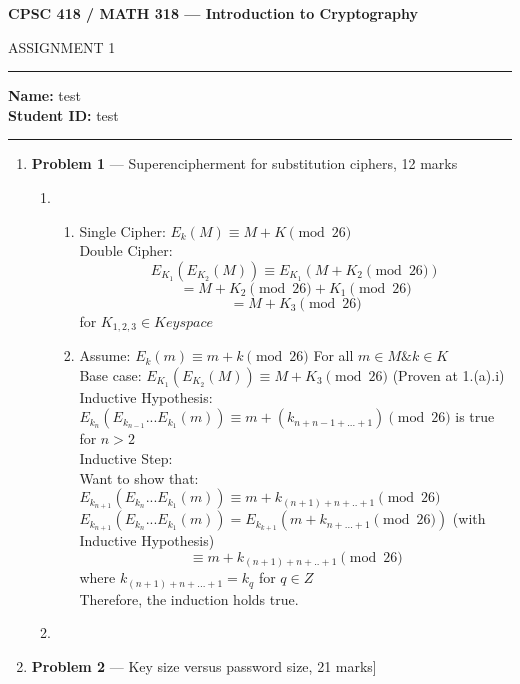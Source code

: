\documentclass[11pt]{article}
\theoremstyle{definition}
\begin{document}
	\begin{center}
		{\bf \Large CPSC 418 / MATH 318 --- Introduction to Cryptography
		
		ASSIGNMENT 1 %
		}
	\end{center}
	
	\hrule 	
	
	\textbf{Name:} test  \\
	\textbf{Student ID:} test 
	
	\medskip \hrule
	
	\begin{enumerate}
	
		\item[] \textbf{Problem 1} --- Superencipherment for substitution ciphers, 12 marks
	
	\begin{enumerate}
		\item
		\begin{enumerate}
			\item Single Cipher: $E_{k}(M) \equiv M + K \pmod{26}$\\
				Double Cipher:\\
				\[E_{K_{1}}(E_{K_{2}}(M)) \equiv E_{K_{1}}(M+K_{2}\pmod{26})\]
				\[= M + K_{2}\pmod{26} + K_{1}\pmod{26}\]
				\[= M + K_{3}\pmod{26}\]
				for $K_{1,2,3} \in Keyspace$
			\item Assume: $E_{k}(m) \equiv m + k\pmod{26}$ For all $m \in M \& k \in K$\\
			Base case: $E_{K_{1}}(E_{K_{2}}(M)) \equiv  M + K_{3}\pmod{26}$ (Proven at 1.(a).i)\\
			Inductive Hypothesis: $E_{k_{n}}(E_{k_{n-1}}...E_{k_{1}}(m)) \equiv m + (k_{n+n-1+...+1} ) \pmod{26}$ is true for $n > 2 $\\
			Inductive Step:\\
			Want to show that: $E_{k_{n+1}}(E_{k_{n}}...E_{k_{1}}(m)) \equiv m + k_{(n+1)+n+..+1} \pmod{26}$\\
			$E_{k_{n+1}}(E_{k_{n}}...E_{k_{1}}(m)) = E_{k_{k+1}}(m+k_{n+...+1}\pmod{26})$ (with Inductive Hypothesis)
			\[\equiv m + k_{(n+1) + n + .. +1} \pmod{26} \] where $k_{(n+1) + n+...+1} = k_q$ for $q \in Z $\\
			Therefore, the induction holds true.
		\end{enumerate}
		\item
		
	\end{enumerate}
	
	
		\item[] \textbf{Problem 2} --- Key size versus password size, 21 marks]
	

\end{enumerate}
\end{document}
